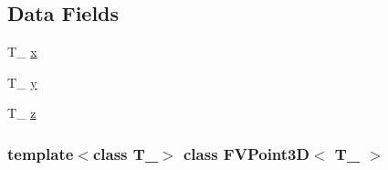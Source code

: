 \subsection*{Data Fields}
\begin{DoxyCompactItemize}
\item 
T\_\- \hyperlink{classFVPoint3D_a4333b1040efe8cd32f7c76bfc2269e0d}{x}
\item 
T\_\- \hyperlink{classFVPoint3D_ab4943c75e718fe503722ac7d26c746a6}{y}
\item 
T\_\- \hyperlink{classFVPoint3D_a28ebcfb48d1adbaee6863174eaeeec7f}{z}
\end{DoxyCompactItemize}
\subsubsection*{template$<$class T\_\-$>$ class FVPoint3D$<$ T\_\- $>$}



